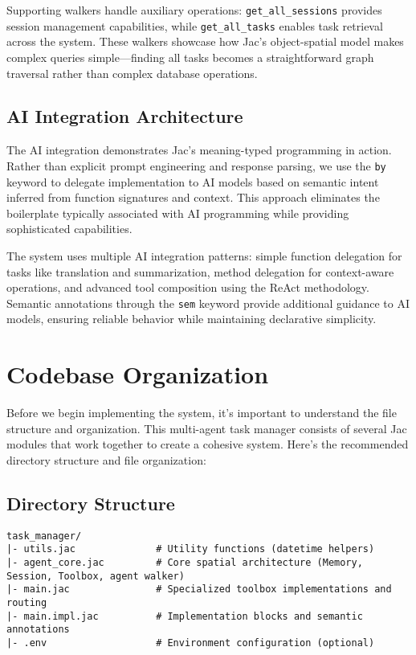 Supporting walkers handle auxiliary operations: \texttt{get\_all\_sessions} provides session management capabilities, while \texttt{get\_all\_tasks} enables task retrieval across the system. These walkers showcase how Jac's object-spatial model makes complex queries simple—finding all tasks becomes a straightforward graph traversal rather than complex database operations.

\subsection{AI Integration Architecture}

The AI integration demonstrates Jac's meaning-typed programming in action. Rather than explicit prompt engineering and response parsing, we use the \texttt{by} keyword to delegate implementation to AI models based on semantic intent inferred from function signatures and context. This approach eliminates the boilerplate typically associated with AI programming while providing sophisticated capabilities.

The system uses multiple AI integration patterns: simple function delegation for tasks like translation and summarization, method delegation for context-aware operations, and advanced tool composition using the ReAct methodology. Semantic annotations through the \texttt{sem} keyword provide additional guidance to AI models, ensuring reliable behavior while maintaining declarative simplicity.

\section{Codebase Organization}

Before we begin implementing the system, it's important to understand the file structure and organization. This multi-agent task manager consists of several Jac modules that work together to create a cohesive system. Here's the recommended directory structure and file organization:

\subsection{Directory Structure}

\begin{lstlisting}[language=shell]
task_manager/
|- utils.jac              # Utility functions (datetime helpers)
|- agent_core.jac         # Core spatial architecture (Memory, Session, Toolbox, agent walker)
|- main.jac               # Specialized toolbox implementations and routing
|- main.impl.jac          # Implementation blocks and semantic annotations
|- .env                   # Environment configuration (optional)
\end{lstlisting}

